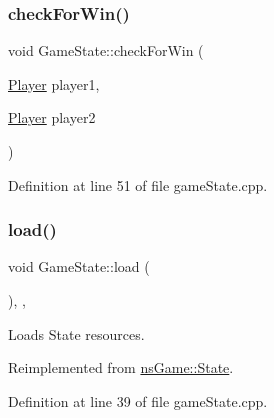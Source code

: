 \subsubsection{\texorpdfstring{check\+For\+Win()}{checkForWin()}}
{\footnotesize\ttfamily void Game\+State\+::check\+For\+Win (\begin{DoxyParamCaption}\item[{\hyperlink{classns_game_1_1_player}{Player}}]{player1,  }\item[{\hyperlink{classns_game_1_1_player}{Player}}]{player2 }\end{DoxyParamCaption})\hspace{0.3cm}{\ttfamily [inline]}}



Definition at line 51 of file game\+State.\+cpp.

\mbox{\label{class_game_state_ab89118f53bfc362e67e061539f3181da}} 
\subsubsection{\texorpdfstring{load()}{load()}}
{\footnotesize\ttfamily void Game\+State\+::load (\begin{DoxyParamCaption}{ }\end{DoxyParamCaption})\hspace{0.3cm}{\ttfamily [inline]}, {\ttfamily [override]}, {\ttfamily [virtual]}}



Loads State resources. 



Reimplemented from \hyperlink{classns_game_1_1_state_a8644de505f7a84933f6d6e6651205791}{ns\+Game\+::\+State}.



Definition at line 39 of file game\+State.\+cpp.

